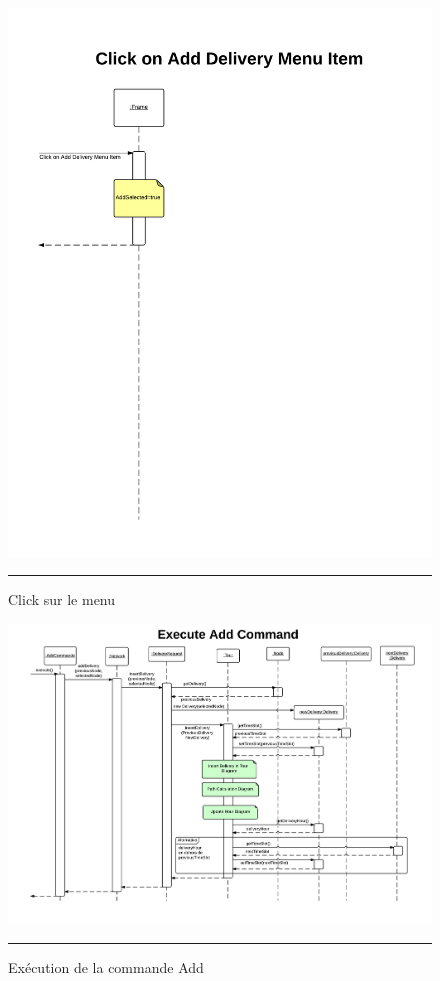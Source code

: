 \begin{figure}[H]
	\centering
		\includegraphics[width=\textwidth,height=\textheight,keepaspectratio]{Figures/ajout_livraison2}
		\rule{35em}{0.5pt}
	\caption[Click sur le menu]{Click sur le menu}
\end{figure}

\clearpage
\begin{figure}[H]
	\centering
		\includegraphics[width=\textwidth,height=\textheight,keepaspectratio, angle=90]{Figures/ajout_livraison3}
		\rule{35em}{0.5pt}
	\caption[Exécution de la commande Add]{Exécution de la commande Add }
\end{figure}

